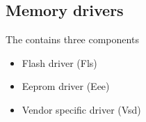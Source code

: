 \subsection{Memory drivers}
The contains three components
\begin{itemize}
\item Flash driver (Fls)
\item Eeprom driver (Eee)
\item Vendor specific driver (Vsd)
\end{itemize}